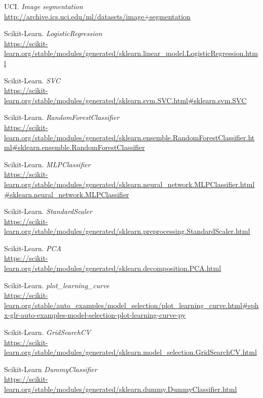 \documentclass[11pt,a4paper]{article}
\begin{document}
\begin{thebibliography}{20}

UCI. \textit{Image segmentation}
\\\url{http://archive.ics.uci.edu/ml/datasets/image+segmentation}

Scikit-Learn. \textit{LogisticRegression}
\\\url{https://scikit-learn.org/stable/modules/generated/sklearn.linear_model.LogisticRegression.html}

Scikit-Learn. \textit{SVC}
\\\url{https://scikit-learn.org/stable/modules/generated/sklearn.svm.SVC.html#sklearn.svm.SVC}

Scikit-Learn. \textit{RandomForestClassifier}
\\\url{https://scikit-learn.org/stable/modules/generated/sklearn.ensemble.RandomForestClassifier.html#sklearn.ensemble.RandomForestClassifier}

Scikit-Learn. \textit{MLPClassifier}
\\\url{https://scikit-learn.org/stable/modules/generated/sklearn.neural_network.MLPClassifier.html#sklearn.neural_network.MLPClassifier}

Scikit-Learn. \textit{StandardScaler}
\\\url{https://scikit-learn.org/stable/modules/generated/sklearn.preprocessing.StandardScaler.html}

Scikit-Learn. \textit{PCA}
\\\url{https://scikit-learn.org/stable/modules/generated/sklearn.decomposition.PCA.html}

Scikit-Learn. \textit{plot\_learning\_curve}
\\\url{https://scikit-learn.org/stable/auto_examples/model_selection/plot_learning_curve.html#sphx-glr-auto-examples-model-selection-plot-learning-curve-py}

Scikit-Learn. \textit{GridSearchCV}
\\\url{https://scikit-learn.org/stable/modules/generated/sklearn.model_selection.GridSearchCV.html}

Scikit-Learn \textit{DummyClassifier}
\\\url{https://scikit-learn.org/stable/modules/generated/sklearn.dummy.DummyClassifier.html}


\end{thebibliography}
\end{document}
